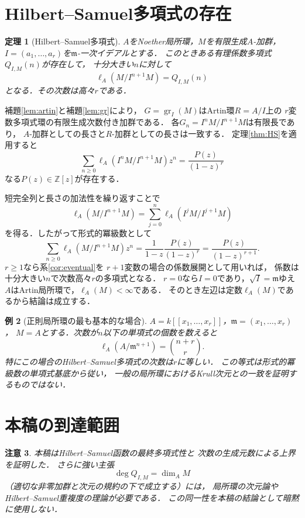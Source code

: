 \documentclass[a5paper,10pt,onecolumn]{jsarticle}
\makeatletter
\theoremstyle{mathnotetheorem}
\newtheorem{theorem}{定理}[section]
\newtheorem{example}[theorem]{例}
\newtheorem{remark}[theorem]{注意}
\renewcommand{\proofname}{証明}
\renewenvironment{proof}[1][\proofname]{%
  \par\pushQED{\qed}\normalfont\topsep4\p@\@plus2\p@\relax
  \trivlist\item[\hskip\labelsep\bfseries #1]\ignorespaces
}{\popQED\endtrivlist\@endpefalse}
\makeatother
\begin{document}
\section{Hilbert--Samuel多項式の存在}
\begin{theorem}[Hilbert--Samuel多項式]\label{thm:HSamuel}
$A$をNoether局所環，$M$を有限生成$A$-加群，
$I=(a_1,\ldots,a_r)$を$\mathfrak m$-一次イデアルとする．
このときある有理係数多項式$Q_{I,M}(n)$が存在して，
十分大きい$n$に対して
\[
 \ell_A(M/I^{n+1}M)=Q_{I,M}(n)
\]
となる．その次数は高々$r$である．
\end{theorem}
\begin{proof}
補題\ref{lem:artin}と補題\ref{lem:gr}により，
$G=\operatorname{gr}_I(M)$はArtin環$R=A/I$上の
$r$変数多項式環の有限生成次数付き加群である．
各$G_n=I^nM/I^{n+1}M$は有限長であり，
$A$-加群としての長さと$R$-加群としての長さは一致する．
定理\ref{thm:HS}を適用すると
\[
 \sum_{n\ge0}\ell_A(I^nM/I^{n+1}M)z^n
 =\frac{P(z)}{(1-z)^r}
\]
なる$P(z)\in\mathbb Z[z]$が存在する．

短完全列と長さの加法性を繰り返すことで
\[
 \ell_A(M/I^{n+1}M)
  =\sum_{j=0}^n\ell_A(I^jM/I^{j+1}M)
\]
を得る．したがって形式的冪級数として
\[
 \sum_{n\ge0}\ell_A(M/I^{n+1}M)z^n
 =\frac{1}{1-z}\frac{P(z)}{(1-z)^r}
 =\frac{P(z)}{(1-z)^{r+1}}.
\]
$r\ge1$なら系\ref{cor:eventual}を
$r+1$変数の場合の係数展開として用いれば，
係数は十分大きい$n$で次数高々$r$の多項式となる．
$r=0$なら$I=0$であり，$\sqrt I=\mathfrak m$ゆえ
$A$はArtin局所環で，$\ell_A(M)<\infty$である．
そのとき左辺は定数$\ell_A(M)$であるから結論は成立する．
\end{proof}

\begin{example}[正則局所環の最も基本的な場合]
$A=k[[x_1,\ldots,x_r]]$，$\mathfrak m=(x_1,\ldots,x_r)$，
$M=A$とする．次数が$n$以下の単項式の個数を数えると
\[
 \ell_A(A/\mathfrak m^{n+1})
   =\binom{n+r}{r}.
\]
特にこの場合のHilbert--Samuel多項式の次数は$r$に等しい．
この等式は形式的冪級数の単項式基底から従い，
一般の局所環におけるKrull次元との一致を証明するものではない．
\end{example}

\section{本稿の到達範囲}
\begin{remark}
本稿はHilbert--Samuel函数の最終多項式性と
次数の生成元数による上界を証明した．
さらに強い主張
\[
 \deg Q_{I,M}=\dim_A M
\]
（適切な非零加群と次元の規約の下で成立する）には，
局所環の次元論やHilbert--Samuel重複度の理論が必要である．
この同一性を本稿の結論として暗黙に使用しない．
\end{remark}
\end{document}
